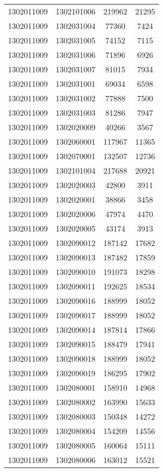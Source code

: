 \begin{longtable}{llcc}
1302011009 & 1302101006 & 219962 & 21295\\
1302011009 & 1302031004 & 77360 & 7424\\
1302011009 & 1302031005 & 74152 & 7115\\
1302011009 & 1302031006 & 71896 & 6926\\
1302011009 & 1302031007 & 81015 & 7934\\
1302011009 & 1302031001 & 69034 & 6598\\
1302011009 & 1302031002 & 77888 & 7500\\
1302011009 & 1302031003 & 81286 & 7947\\
1302011009 & 1302020009 & 40266 & 3567\\
1302011009 & 1302060001 & 117967 & 11365\\
1302011009 & 1302070001 & 132507 & 12736\\
1302011009 & 1302101004 & 217688 & 20921\\
1302011009 & 1302020003 & 42800 & 3911\\
1302011009 & 1302020001 & 38866 & 3458\\
1302011009 & 1302020006 & 47974 & 4470\\
1302011009 & 1302020005 & 43174 & 3913\\
1302011009 & 1302090012 & 187142 & 17682\\
1302011009 & 1302090013 & 187482 & 17859\\
1302011009 & 1302090010 & 191073 & 18298\\
1302011009 & 1302090011 & 192625 & 18534\\
1302011009 & 1302090016 & 188999 & 18052\\
1302011009 & 1302090017 & 188999 & 18052\\
1302011009 & 1302090014 & 187814 & 17866\\
1302011009 & 1302090015 & 188479 & 17941\\
1302011009 & 1302090018 & 188999 & 18052\\
1302011009 & 1302090019 & 186295 & 17902\\
1302011009 & 1302080001 & 158910 & 14968\\
1302011009 & 1302080002 & 163990 & 15633\\
1302011009 & 1302080003 & 150348 & 14272\\
1302011009 & 1302080004 & 154209 & 14556\\
1302011009 & 1302080005 & 160064 & 15111\\
1302011009 & 1302080006 & 163012 & 15521\\

\end{longtable}
